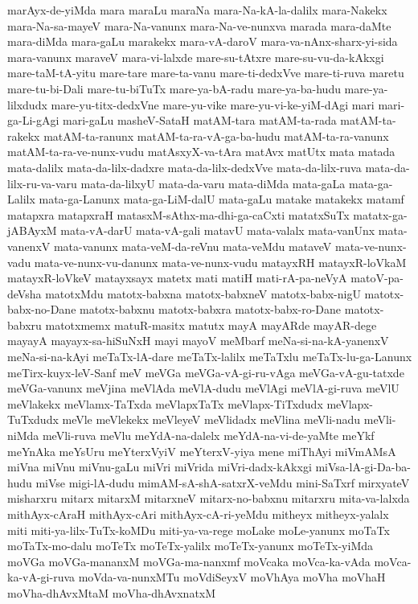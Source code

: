 {marAyx-de-yiMda
mara
maraLu
maraNa
mara-Na-kA-la-dalilx
mara-Nakekx
mara-Na-sa-mayeV
mara-Na-vanunx
mara-Na-ve-nunxva
marada
mara-daMte
mara-diMda
mara-gaLu
marakekx
mara-vA-daroV
mara-va-nAnx-sharx-yi-sida
mara-vanunx
maraveV
mara-vi-lalxde
mare-su-tAtxre
mare-su-vu-da-kAkxgi
mare-taM-tA-yitu
mare-tare
mare-ta-vanu
mare-ti-dedxVve
mare-ti-ruva
maretu
mare-tu-bi-Dali
mare-tu-biTuTx
mare-ya-bA-radu
mare-ya-ba-hudu
mare-ya-lilxdudx
mare-yu-titx-dedxVne
mare-yu-vike
mare-yu-vi-ke-yiM-dAgi
mari
mari-ga-Li-gAgi
mari-gaLu
masheV-SataH
matAM-tara
matAM-ta-rada
matAM-ta-rakekx
matAM-ta-ranunx
matAM-ta-ra-vA-ga-ba-hudu
matAM-ta-ra-vanunx
matAM-ta-ra-ve-nunx-vudu
matAsxyX-va-tAra
matAvx
matUtx
mata
matada
mata-dalilx
mata-da-lilx-dadxre
mata-da-lilx-dedxVve
mata-da-lilx-ruva
mata-da-lilx-ru-va-varu
mata-da-lilxyU
mata-da-varu
mata-diMda
mata-gaLa
mata-ga-Lalilx
mata-ga-Lanunx
mata-ga-LiM-dalU
mata-gaLu
matake
matakekx
matamf
matapxra
matapxraH
matasxM-sAthx-ma-dhi-ga-caCxti
matatxSuTx
matatx-ga-jABAyxM
mata-vA-darU
mata-vA-gali
matavU
mata-valalx
mata-vanUnx
mata-vanenxV
mata-vanunx
mata-veM-da-reVnu
mata-veMdu
mataveV
mata-ve-nunx-vadu
mata-ve-nunx-vu-danunx
mata-ve-nunx-vudu
matayxRH
matayxR-loVkaM
matayxR-loVkeV
matayxsayx
matetx
mati
matiH
mati-rA-pa-neVyA
matoV-pa-deVsha
matotxMdu
matotx-babxna
matotx-babxneV
matotx-babx-nigU
matotx-babx-no-Dane
matotx-babxnu
matotx-babxra
matotx-babx-ro-Dane
matotx-babxru
matotxmemx
matuR-masitx
matutx
mayA
mayARde
mayAR-dege
mayayA
mayayx-sa-hiSuNxH
mayi
mayoV
meMbarf
meNa-si-na-kA-yanenxV
meNa-si-na-kAyi
meTaTx-lA-dare
meTaTx-lalilx
meTaTxlu
meTaTx-lu-ga-Lanunx
meTirx-kuyx-leV-Sanf
meV
meVGa
meVGa-vA-gi-ru-vAga
meVGa-vA-gu-tatxde
meVGa-vanunx
meVjina
meVlAda
meVlA-dudu
meVlAgi
meVlA-gi-ruva
meVlU
meVlakekx
meVlamx-TaTxda
meVlapxTaTx
meVlapx-TiTxdudx
meVlapx-TuTxdudx
meVle
meVlekekx
meVleyeV
meVlidadx
meVlina
meVli-nadu
meVli-niMda
meVli-ruva
meVlu
meYdA-na-dalelx
meYdA-na-vi-de-yaMte
meYkf
meYnAka
meYsUru
meYterxVyiV
meYterxV-yiya
mene
miThAyi
miVmAMsA
miVna
miVnu
miVnu-gaLu
miVri
miVrida
miVri-dadx-kAkxgi
miVsa-lA-gi-Da-ba-hudu
miVse
migi-lA-dudu
mimAM-sA-shA-satxrX-veMdu
mini-SaTxrf
mirxyateV
misharxru
mitarx
mitarxM
mitarxneV
mitarx-no-babxnu
mitarxru
mita-va-lalxda
mithAyx-cAraH
mithAyx-cAri
mithAyx-cA-ri-yeMdu
mitheyx
mitheyx-yalalx
miti
miti-ya-lilx-TuTx-koMDu
miti-ya-va-rege
moLake
moLe-yanunx
moTaTx
moTaTx-mo-dalu
moTeTx
moTeTx-yalilx
moTeTx-yanunx
moTeTx-yiMda
moVGa
moVGa-mananxM
moVGa-ma-nanxmf
moVcaka
moVca-ka-vAda
moVca-ka-vA-gi-ruva
moVda-va-nunxMTu
moVdiSeyxV
moVhAya
moVha
moVhaH
moVha-dhAvxMtaM
moVha-dhAvxnatxM
}
